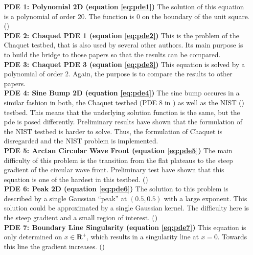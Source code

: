 \documentclass[./\jobname.tex]{subfiles}
\begin{document}
\textbf{PDE 1: Polynomial 2D (equation \ref{eq:pde1})} The solution of this equation is a polynomial of order 20. The function is 0 on the boundary of the unit square. (\cite{mitchell_nist_2018}) \\

\textbf{PDE 2: Chaquet PDE 1 (equation \ref{eq:pde2})} This is the problem of the Chaquet testbed, that is also used by several other authors. Its main purpose is to build the bridge to those papers so that the results can be compared. \cite{chaquet_using_2019} \\

\textbf{PDE 3: Chaquet PDE 3 (equation \ref{eq:pde3})} This equation is solved by a polynomial of order 2. Again, the purpose is to compare the results to other papers. \cite{chaquet_using_2019} \\

\textbf{PDE 4: Sine Bump 2D (equation \ref{eq:pde4})} The sine bump occures in a similar fashion in both, the Chaquet testbed (PDE 8 in \cite{chaquet_using_2019}) as well as the NIST (\cite{mitchell_nist_2018}) testbed. This means that the underlying solution function is the same, but the \gls{pde} is posed differently. Preliminary results have shown that the formulation of the NIST testbed is harder to solve. Thus, the formulation of Chaquet is disregarded and the NIST problem is implemented. \\

\textbf{PDE 5: Arctan Circular Wave Front (equation \ref{eq:pde5})} The main difficulty of this problem is the transition from the flat plateaus to the steep gradient of the circular wave front. Preliminary test have shown that this equation is one of the hardest in this testbed. (\cite{mitchell_nist_2018})\\

\textbf{PDE 6: Peak 2D (equation \ref{eq:pde6})} The solution to this problem is described by a single Gaussian ``peak'' at $(0.5, 0.5)$ with a large exponent. This solution could be approximated by a single Gaussian kernel. The difficulty here is the steep gradient and a small region of interest. (\cite{mitchell_nist_2018})\\

\textbf{PDE 7: Boundary Line Singularity (equation \ref{eq:pde7})} This equation is only determined on $x \in \mathbf{R}^{+}$, which results in a singularity line at $x = 0$. Towards this line the gradient increases.  (\cite{mitchell_nist_2018})\\
\end{document}
